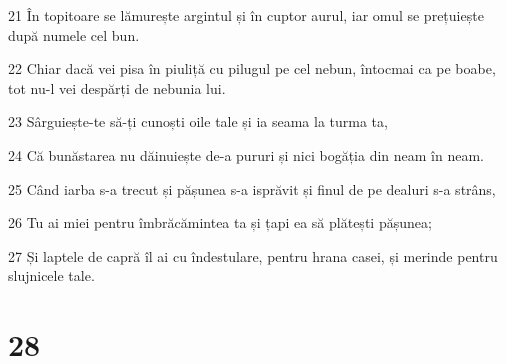 \par 21 În topitoare se lămurește argintul și în cuptor aurul, iar omul se prețuiește după numele cel bun.
\par 22 Chiar dacă vei pisa în piuliță cu pilugul pe cel nebun, întocmai ca pe boabe, tot nu-l vei despărți de nebunia lui.
\par 23 Sârguiește-te să-ți cunoști oile tale și ia seama la turma ta,
\par 24 Că bunăstarea nu dăinuiește de-a pururi și nici bogăția din neam în neam.
\par 25 Când iarba s-a trecut și pășunea s-a isprăvit și finul de pe dealuri s-a strâns,
\par 26 Tu ai miei pentru îmbrăcămintea ta și țapi ea să plătești pășunea;
\par 27 Și laptele de capră îl ai cu îndestulare, pentru hrana casei, și merinde pentru slujnicele tale.

\chapter{28}

